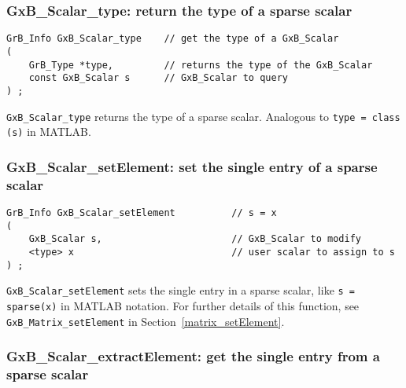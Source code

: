 \documentclass[12pt]{article}
\begin{document}
\subsubsection{{\sf GxB\_Scalar\_type:} return the type of a sparse scalar}
\label{scalar_type}

\begin{mdframed}[userdefinedwidth=6in]
{\footnotesize
\begin{verbatim}
GrB_Info GxB_Scalar_type    // get the type of a GxB_Scalar
(
    GrB_Type *type,         // returns the type of the GxB_Scalar
    const GxB_Scalar s      // GxB_Scalar to query
) ;
\end{verbatim}
} \end{mdframed}

\verb'GxB_Scalar_type' returns the type of a sparse scalar.  Analogous to
\verb'type = class (s)' in MATLAB.

\subsubsection{{\sf GxB\_Scalar\_setElement:} set the single entry of a sparse scalar}
\label{scalar_setElement}

\begin{mdframed}[userdefinedwidth=6in]
{\footnotesize
\begin{verbatim}
GrB_Info GxB_Scalar_setElement          // s = x
(
    GxB_Scalar s,                       // GxB_Scalar to modify
    <type> x                            // user scalar to assign to s
) ;
\end{verbatim} } \end{mdframed}

\verb'GxB_Scalar_setElement' sets the single entry in a sparse scalar, like
\verb's = sparse(x)' in MATLAB notation.  For further details of this function,
see \verb'GxB_Matrix_setElement' in Section~\ref{matrix_setElement}.

\subsubsection{{\sf GxB\_Scalar\_extractElement:} get the single entry from a sparse scalar}
\label{scalar_extractElement}
\end{document}

